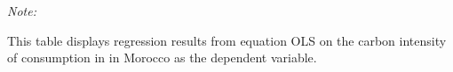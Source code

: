 \begin{table}[htbp!]
\begin{adjustbox}{width = 1\textwidth, max height = 0.95\textheight, center}
\begin{threeparttable}[b]
         \begin{tablenotes}\item \medskip \textit{Note:}
            \item This table displays regression results from equation OLS on the carbon intensity of consumption in  in Morocco as the dependent variable. 
         \end{tablenotes}
      \end{threeparttable}
   \end{adjustbox}
\end{table}


